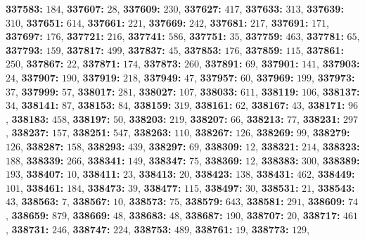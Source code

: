 \textsf{\bfseries 337583:} $184$, \textsf{\bfseries 337607:} $28$, \textsf{\bfseries 337609:} $230$, \textsf{\bfseries 337627:} $417$, \textsf{\bfseries 337633:} $313$, \textsf{\bfseries 337639:} $310$, \textsf{\bfseries 337651:} $614$, \textsf{\bfseries 337661:} $221$, \textsf{\bfseries 337669:} $242$, \textsf{\bfseries 337681:} $217$, \textsf{\bfseries 337691:} $171$, \textsf{\bfseries 337697:} $176$, \textsf{\bfseries 337721:} $216$, \textsf{\bfseries 337741:} $586$, \textsf{\bfseries 337751:} $35$, \textsf{\bfseries 337759:} $463$, \textsf{\bfseries 337781:} $65$, \textsf{\bfseries 337793:} $159$, \textsf{\bfseries 337817:} $499$, \textsf{\bfseries 337837:} $45$, \textsf{\bfseries 337853:} $176$, \textsf{\bfseries 337859:} $115$, \textsf{\bfseries 337861:} $250$, \textsf{\bfseries 337867:} $22$, \textsf{\bfseries 337871:} $174$, \textsf{\bfseries 337873:} $260$, \textsf{\bfseries 337891:} $69$, \textsf{\bfseries 337901:} $141$, \textsf{\bfseries 337903:} $24$, \textsf{\bfseries 337907:} $190$, \textsf{\bfseries 337919:} $218$, \textsf{\bfseries 337949:} $47$, \textsf{\bfseries 337957:} $60$, \textsf{\bfseries 337969:} $199$, \textsf{\bfseries 337973:} $37$, \textsf{\bfseries 337999:} $57$, \textsf{\bfseries 338017:} $281$, \textsf{\bfseries 338027:} $107$, \textsf{\bfseries 338033:} $611$, \textsf{\bfseries 338119:} $106$, \textsf{\bfseries 338137:} $34$, \textsf{\bfseries 338141:} $87$, \textsf{\bfseries 338153:} $84$, \textsf{\bfseries 338159:} $319$, \textsf{\bfseries 338161:} $62$, \textsf{\bfseries 338167:} $43$, \textsf{\bfseries 338171:} $96$, \textsf{\bfseries 338183:} $458$, \textsf{\bfseries 338197:} $50$, \textsf{\bfseries 338203:} $219$, \textsf{\bfseries 338207:} $66$, \textsf{\bfseries 338213:} $77$, \textsf{\bfseries 338231:} $297$, \textsf{\bfseries 338237:} $157$, \textsf{\bfseries 338251:} $547$, \textsf{\bfseries 338263:} $110$, \textsf{\bfseries 338267:} $126$, \textsf{\bfseries 338269:} $99$, \textsf{\bfseries 338279:} $126$, \textsf{\bfseries 338287:} $158$, \textsf{\bfseries 338293:} $439$, \textsf{\bfseries 338297:} $69$, \textsf{\bfseries 338309:} $12$, \textsf{\bfseries 338321:} $214$, \textsf{\bfseries 338323:} $188$, \textsf{\bfseries 338339:} $266$, \textsf{\bfseries 338341:} $149$, \textsf{\bfseries 338347:} $75$, \textsf{\bfseries 338369:} $12$, \textsf{\bfseries 338383:} $300$, \textsf{\bfseries 338389:} $193$, \textsf{\bfseries 338407:} $10$, \textsf{\bfseries 338411:} $23$, \textsf{\bfseries 338413:} $20$, \textsf{\bfseries 338423:} $138$, \textsf{\bfseries 338431:} $462$, \textsf{\bfseries 338449:} $101$, \textsf{\bfseries 338461:} $184$, \textsf{\bfseries 338473:} $39$, \textsf{\bfseries 338477:} $115$, \textsf{\bfseries 338497:} $30$, \textsf{\bfseries 338531:} $21$, \textsf{\bfseries 338543:} $43$, \textsf{\bfseries 338563:} $7$, \textsf{\bfseries 338567:} $10$, \textsf{\bfseries 338573:} $75$, \textsf{\bfseries 338579:} $643$, \textsf{\bfseries 338581:} $291$, \textsf{\bfseries 338609:} $74$, \textsf{\bfseries 338659:} $879$, \textsf{\bfseries 338669:} $48$, \textsf{\bfseries 338683:} $48$, \textsf{\bfseries 338687:} $190$, \textsf{\bfseries 338707:} $20$, \textsf{\bfseries 338717:} $461$, \textsf{\bfseries 338731:} $246$, \textsf{\bfseries 338747:} $224$, \textsf{\bfseries 338753:} $489$, \textsf{\bfseries 338761:} $19$, \textsf{\bfseries 338773:} $129$, 
